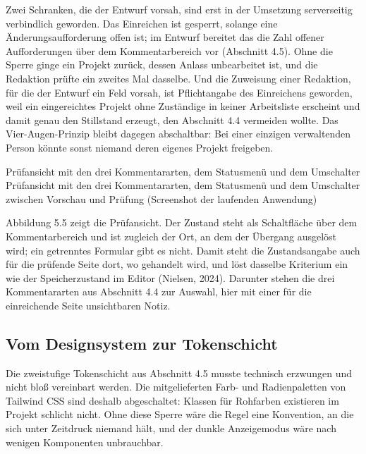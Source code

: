 Zwei Schranken, die der Entwurf vorsah, sind erst in der Umsetzung serverseitig verbindlich geworden. Das Einreichen ist gesperrt, solange eine Änderungsaufforderung offen ist; im Entwurf bereitet das die Zahl offener Aufforderungen über dem Kommentarbereich vor (Abschnitt 4.5). Ohne die Sperre ginge ein Projekt zurück, dessen Anlass unbearbeitet ist, und die Redaktion prüfte ein zweites Mal dasselbe. Und die Zuweisung einer Redaktion, für die der Entwurf ein Feld vorsah, ist Pflichtangabe des Einreichens geworden, weil ein eingereichtes Projekt ohne Zuständige in keiner Arbeitsliste erscheint und damit genau den Stillstand erzeugt, den Abschnitt 4.4 vermeiden wollte. Das Vier-Augen-Prinzip bleibt dagegen abschaltbar: Bei einer einzigen verwaltenden Person könnte sonst niemand deren eigenes Projekt freigeben.

%
{Prüfansicht mit den drei Kommentararten, dem Statusmenü und dem Umschalter}%
{Prüfansicht mit den drei Kommentararten, dem Statusmenü und dem Umschalter zwischen Vorschau und Prüfung (Screenshot der laufenden Anwendung)}

Abbildung 5.5 zeigt die Prüfansicht. Der Zustand steht als Schaltfläche über dem Kommentarbereich und ist zugleich der Ort, an dem der Übergang ausgelöst wird; ein getrenntes Formular gibt es nicht. Damit steht die Zustandsangabe auch für die prüfende Seite dort, wo gehandelt wird, und löst dasselbe Kriterium ein wie der Speicherzustand im Editor (Nielsen, 2024). Darunter stehen die drei Kommentararten aus Abschnitt 4.4 zur Auswahl, hier mit einer für die einreichende Seite unsichtbaren Notiz.

\subsection{Vom Designsystem zur Tokenschicht}

Die zweistufige Tokenschicht aus Abschnitt 4.5 musste technisch erzwungen und nicht bloß vereinbart werden. Die mitgelieferten Farb- und Radienpaletten von Tailwind CSS sind deshalb abgeschaltet: Klassen für Rohfarben existieren im Projekt schlicht nicht. Ohne diese Sperre wäre die Regel eine Konvention, an die sich unter Zeitdruck niemand hält, und der dunkle Anzeigemodus wäre nach wenigen Komponenten unbrauchbar.

